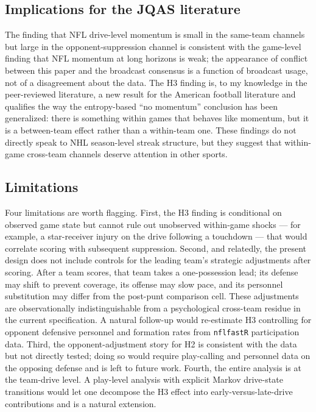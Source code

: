 \documentclass[11pt]{article}
\begin{document}
\subsection{Implications for the JQAS literature}

The finding that NFL drive-level momentum is small in the same-team channels
but large in the opponent-suppression channel is consistent with the
\citet{fry2012searching} game-level finding that NFL momentum at long
horizons is weak; the appearance of conflict between this paper and the
broadcast consensus is a function of broadcast usage, not of a disagreement
about the data. The H3 finding is, to my knowledge in the peer-reviewed literature, a new result for the
American football literature and qualifies the way the
\citet{steeger2021winning} entropy-based ``no momentum'' conclusion has been
generalized: there is something within games that behaves like momentum,
but it is a between-team effect rather than a within-team one. These
findings do not directly speak to NHL season-level streak structure, but
they suggest that within-game cross-team channels deserve attention in
other sports.

\subsection{Limitations}\label{sec:limits}

Four limitations are worth flagging. First, the H3 finding is conditional
on observed game state but cannot rule out unobserved within-game shocks
--- for example, a star-receiver injury on the drive following a touchdown
--- that would correlate scoring with subsequent suppression. Second, and
relatedly, the present design does not include controls for the leading
team's strategic adjustments after scoring. After a team scores, that team
takes a one-possession lead; its defense may shift to prevent coverage,
its offense may slow pace, and its personnel substitution may differ from
the post-punt comparison cell. These adjustments are observationally
indistinguishable from a psychological cross-team residue in the current
specification. A natural follow-up would re-estimate H3 controlling for
opponent defensive personnel and formation rates from \texttt{nflfastR}
participation data. Third, the opponent-adjustment story for H2 is
consistent with the data but not directly tested; doing so would require
play-calling and personnel data on the opposing defense and is left to
future work. Fourth, the entire analysis is at the team-drive level. A
play-level analysis with explicit Markov drive-state transitions
\citep{goldner2012markov} would let one decompose the H3 effect into
early-versus-late-drive contributions and is a natural extension.
\end{document}
